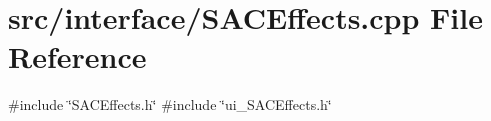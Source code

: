 \section{src/interface/\+S\+A\+C\+Effects.cpp File Reference}
\label{_s_a_c_effects_8cpp}
{\ttfamily \#include \char`\"{}S\+A\+C\+Effects.\+h\char`\"{}}\newline
{\ttfamily \#include \char`\"{}ui\+\_\+\+S\+A\+C\+Effects.\+h\char`\"{}}\newline
